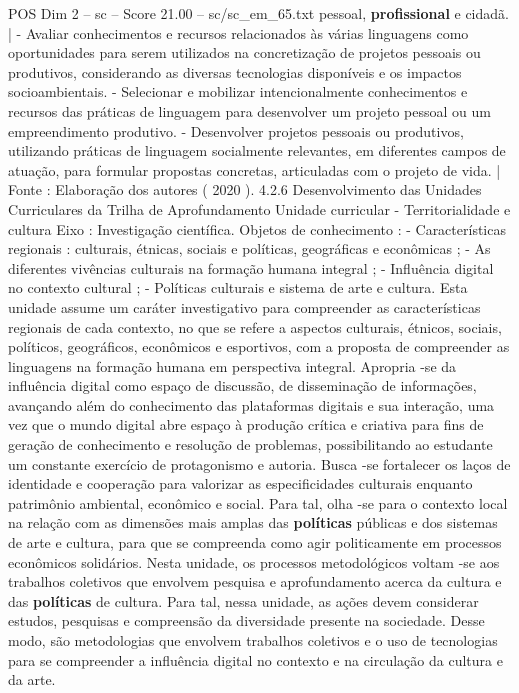 \begin{textsample}{POS Dim 2 – sc – Score 21.00 – sc/sc\_em\_65.txt}
pessoal, \textbf{profissional} e cidadã. | - Avaliar conhecimentos e recursos relacionados às várias linguagens como oportunidades para serem utilizados na concretização de projetos pessoais ou produtivos, considerando as diversas tecnologias disponíveis e os impactos socioambientais. - Selecionar e mobilizar intencionalmente conhecimentos e recursos das práticas de linguagem para desenvolver um projeto pessoal ou um empreendimento produtivo. - Desenvolver projetos pessoais ou produtivos, utilizando práticas de linguagem socialmente relevantes, em diferentes campos de atuação, para formular propostas concretas, articuladas com o projeto de vida. | Fonte : Elaboração dos autores ( 2020 ). 4.2.6 Desenvolvimento das Unidades Curriculares da Trilha de Aprofundamento Unidade curricular - Territorialidade e cultura Eixo : Investigação científica.
Objetos de conhecimento : - Características regionais : culturais, étnicas, sociais e políticas, geográficas e econômicas ; - As diferentes vivências culturais na formação humana integral ; - Influência digital no contexto cultural ; - Políticas culturais e sistema de arte e cultura.
Esta unidade assume um caráter investigativo para compreender as características regionais de cada contexto, no que se refere a aspectos culturais, étnicos, sociais, políticos, geográficos, econômicos e esportivos, com a proposta de compreender as linguagens na formação humana em perspectiva integral.
Apropria -se da influência digital como espaço de discussão, de disseminação de informações, avançando além do conhecimento das plataformas digitais e sua interação, uma vez que o mundo digital abre espaço à produção crítica e criativa para fins de geração de conhecimento e resolução de problemas, possibilitando ao estudante um constante exercício de protagonismo e autoria.
Busca -se fortalecer os laços de identidade e cooperação para valorizar as especificidades culturais enquanto patrimônio ambiental, econômico e social.
Para tal, olha -se para o contexto local na relação com as dimensões mais amplas das \textbf{políticas} públicas e dos sistemas de arte e cultura, para que se compreenda como agir politicamente em processos econômicos solidários.
Nesta unidade, os processos metodológicos voltam -se aos trabalhos coletivos que envolvem pesquisa e aprofundamento acerca da cultura e das \textbf{políticas} de cultura.
Para tal, nessa unidade, as ações devem considerar estudos, pesquisas e compreensão da diversidade presente na sociedade.
Desse modo, são metodologias que envolvem trabalhos coletivos e o uso de tecnologias para se compreender a influência digital no contexto e na circulação da cultura e da arte.

\end{textsample}
